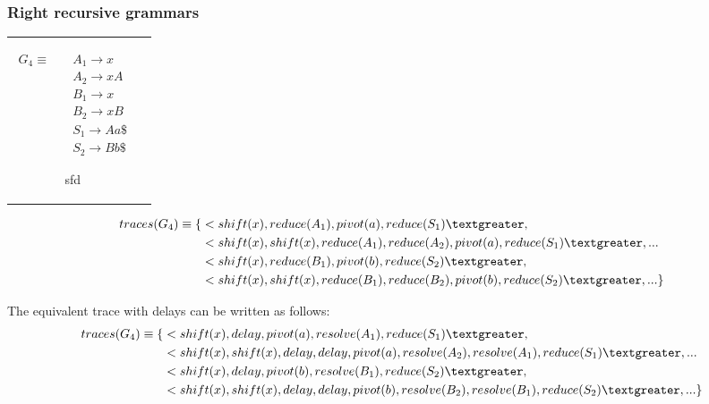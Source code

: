 \documentclass[11pt]{article}
\begin{document}
\subsubsection{Right recursive grammars}
\begin{tabular}[t]{cl}
\parbox{.3\textwidth}{
\begin{align*}
G_4 \equiv \quad & A_1 \rightarrow x\\
                 & A_2 \rightarrow x A\\
                 & B_1 \rightarrow x\\
                 & B_2 \rightarrow x B\\
                 & S_1 \rightarrow A a \$\\
                 & S_2 \rightarrow B b \$
\end{align*}}
\parbox{.8\textwidth}{sfd}
\end{tabular}

\begin{align*}
traces(G_4) \equiv \{ & \textless shift(x), reduce(A_1), pivot(a), reduce(S_1) \textgreater,\\
                      & \textless shift(x), shift(x), reduce(A_1), reduce(A_2), pivot(a), reduce(S_1) \textgreater, ... \\
                      & \textless shift(x), reduce(B_1), pivot(b), reduce(S_2) \textgreater,\\
                      & \textless shift(x), shift(x), reduce(B_1), reduce(B_2), pivot(b), reduce(S_2) \textgreater, ... \}
\end{align*}

The equivalent trace with delays can be written as follows:
\begin{align*}
traces(G_4) \equiv \{ & \textless shift(x), delay, pivot(a), resolve(A_1), reduce(S_1) \textgreater,\\
                      & \textless shift(x), shift(x), delay, delay, pivot(a), resolve(A_2), resolve(A_1), reduce(S_1) \textgreater, ... \\
                      & \textless shift(x), delay, pivot(b), resolve(B_1), reduce(S_2) \textgreater,\\
                      & \textless shift(x), shift(x), delay, delay, pivot(b), resolve(B_2), resolve(B_1), reduce(S_2) \textgreater, ... \}
\end{align*}

\end{document}
